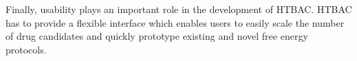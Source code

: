 Finally, usability plays an important role in the development of HTBAC. HTBAC
has to provide a flexible interface which enables users to easily scale the
number of drug candidates and quickly prototype existing and novel free
energy protocols.












